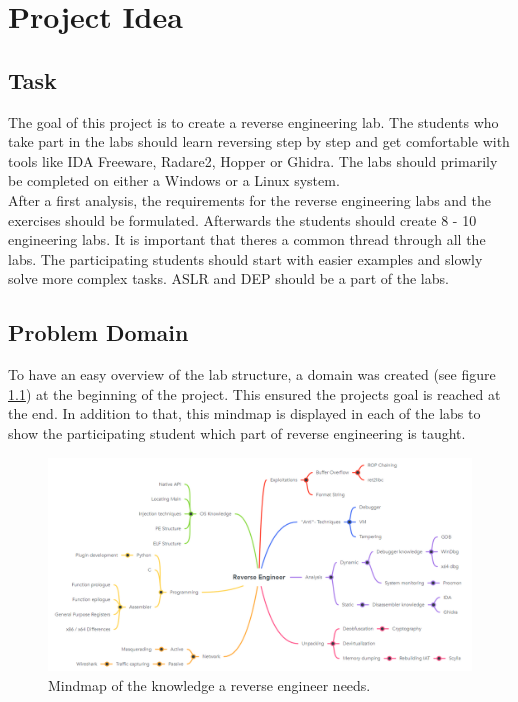 \chapter{Project Idea}
\section{Task}
\label{sec:task}
The goal of this project is to create a reverse engineering lab. The students who take part in the labs should learn reversing step by step and get comfortable with tools like IDA Freeware, Radare2, Hopper or Ghidra. The labs should primarily be completed on either a Windows or a Linux system. \\
After a first analysis, the requirements for the reverse engineering labs and the exercises should be formulated. Afterwards the students should create 8 - 10 engineering labs. It is important that theres a common thread through all the labs. The participating students should start with easier examples and slowly solve more complex tasks. ASLR and DEP should be a part of the labs.

\section{Problem Domain}
To have an easy overview of the lab structure, a domain was created (see figure \ref{fig:mindmap}) at the beginning of the project. This ensured the projects goal is reached at the end. In addition to that, this mindmap is displayed in each of the labs to show the participating student which part of reverse engineering is taught.
\begin{figure}[H]
    \includegraphics[width=\linewidth, center]{resources/RE_Domain_Light.png}
    \caption{Mindmap of the knowledge a reverse engineer needs.}
    \label{fig:mindmap}
\end{figure}

